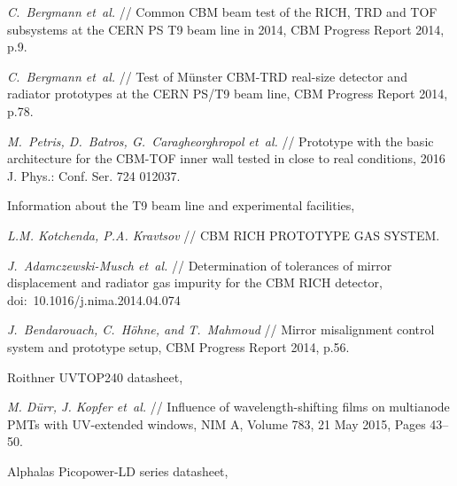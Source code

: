 \begin{thebibliography}{99}
\textit{C.~Bergmann et~al.} //
Common CBM beam test of the RICH, TRD and TOF subsystems at the CERN PS T9 beam line in 2014,
CBM Progress Report 2014, p.9.

\textit{C.~Bergmann et~al.} //
Test of M\"unster CBM-TRD real-size detector and radiator prototypes at the CERN PS/T9 beam line,
CBM Progress Report 2014, p.78.

\textit{M.~Petris, D.~Batros, G.~Caragheorghropol et~al.} //
Prototype with the basic architecture for the CBM-TOF inner wall tested in close to real conditions,
2016 J. Phys.: Conf. Ser. 724 012037.

Information about the T9 beam line and experimental facilities,

\textit{L.M. Kotchenda, P.A. Kravtsov} //
CBM RICH PROTOTYPE GAS SYSTEM.

\textit{J.~Adamczewski-Musch et~al.} //
Determination of tolerances of mirror displacement and radiator gas impurity for the CBM RICH detector,
doi:~10.1016/j.nima.2014.04.074

\textit{J.~Bendarouach, C.~H\"{o}hne, and T.~Mahmoud} //
Mirror misalignment control system and prototype setup,
CBM Progress Report 2014, p.56.

Roithner UVTOP240 datasheet,

\textit{M. D\"{u}rr, J. Kopfer et~al.} //
Influence of wavelength-shifting films on multianode PMTs with UV-extended windows,
NIM A, Volume 783, 21 May 2015, Pages 43–50.

Alphalas Picopower-LD series datasheet,




\end{thebibliography}
